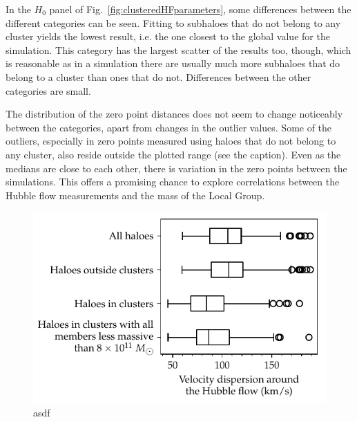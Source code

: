 \documentclass[english, oneside]{HYgradu}
\begin{document}
In the $H_0$ panel of Fig.~\ref{fig:clusteredHFparameters}, some differences between the different categories can be seen. Fitting to subhaloes that do not belong to any cluster yields the lowest result, i.e. the one closest to the global value for the simulation. This category has the largest scatter of the results too, though, which is reasonable as in a simulation there are usually much more subhaloes that do belong to a cluster than ones that do not. Differences between the other categories are small.

The distribution of the zero point distances does not seem to change noticeably between the categories, apart from changes in the outlier values. Some of the outliers, especially in zero points measured using haloes that do not belong to any cluster, also reside outside the plotted range (see the caption). Even as the medians are close to each other, there is variation in the zero points between the simulations. This offers a promising chance to explore correlations between the Hubble flow measurements and the mass of the Local Group.



\begin{figure}
    \centering
    \includegraphics{kuvat/clusteredHFdispersions.pdf}
    \caption{asdf}\label{fig:clusteredHFdispersions}
\end{figure}
\end{document}

